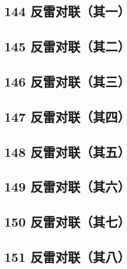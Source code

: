 \hypertarget{ux53cdux96f7ux5bf9ux8054ux5176ux4e00}{%
\subsection{144
反雷对联（其一）}\label{ux53cdux96f7ux5bf9ux8054ux5176ux4e00}}

\hypertarget{ux53cdux96f7ux5bf9ux8054ux5176ux4e8c}{%
\subsection{145
反雷对联（其二）}\label{ux53cdux96f7ux5bf9ux8054ux5176ux4e8c}}

\hypertarget{ux53cdux96f7ux5bf9ux8054ux5176ux4e09}{%
\subsection{146
反雷对联（其三）}\label{ux53cdux96f7ux5bf9ux8054ux5176ux4e09}}

\hypertarget{ux53cdux96f7ux5bf9ux8054ux5176ux56db}{%
\subsection{147
反雷对联（其四）}\label{ux53cdux96f7ux5bf9ux8054ux5176ux56db}}

\hypertarget{ux53cdux96f7ux5bf9ux8054ux5176ux4e94}{%
\subsection{148
反雷对联（其五）}\label{ux53cdux96f7ux5bf9ux8054ux5176ux4e94}}

\hypertarget{ux53cdux96f7ux5bf9ux8054ux5176ux516d}{%
\subsection{149
反雷对联（其六）}\label{ux53cdux96f7ux5bf9ux8054ux5176ux516d}}

\hypertarget{ux53cdux96f7ux5bf9ux8054ux5176ux4e03}{%
\subsection{150
反雷对联（其七）}\label{ux53cdux96f7ux5bf9ux8054ux5176ux4e03}}

\hypertarget{ux53cdux96f7ux5bf9ux8054ux5176ux516b}{%
\subsection{151
反雷对联（其八）}\label{ux53cdux96f7ux5bf9ux8054ux5176ux516b}}


